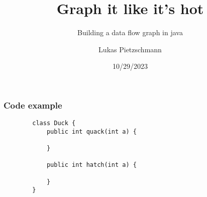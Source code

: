 \documentclass[aspectratio=169, usepdftitle=false, xcolor={dvipsnames}]{beamer}
\title[\insertsubtitle]{Graph it like it's hot}
\author{Lukas Pietzschmann}
\subtitle{Building a data flow graph in java}
\institute{Institute of Software Engineering and\\Programming Languages}
\date{10/29/2023}
\begin{document}
\maketitle

\begin{frame}[fragile]
	\frametitle{Code example}
	\begin{verbatim}
		class Duck {
			public int quack(int a) {

			}

			public int hatch(int a) {

			}
		}
	\end{verbatim}
\end{frame}
\end{document}

